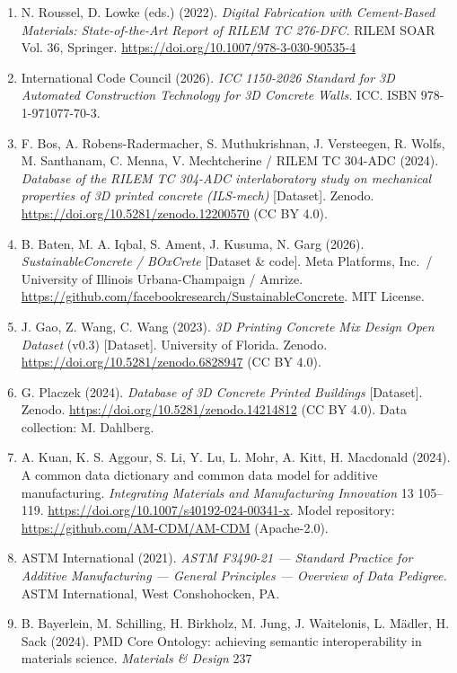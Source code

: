 \documentclass[
  11pt,
  letterpaper,
]{article}
\begin{document}
\begin{enumerate}
\item
  N. Roussel, D. Lowke (eds.) (2022). \emph{Digital Fabrication with
  Cement-Based Materials: State-of-the-Art Report of RILEM TC 276-DFC.}
  RILEM SOAR Vol. 36, Springer.
  \url{https://doi.org/10.1007/978-3-030-90535-4}
\item
  International Code Council (2026). \emph{ICC 1150-2026 Standard for 3D
  Automated Construction Technology for 3D Concrete Walls.} ICC. ISBN
  978-1-971077-70-3.
\item
  F. Bos, A. Robens-Radermacher, S. Muthukrishnan, J. Versteegen, R.
  Wolfs, M. Santhanam, C. Menna, V. Mechtcherine / RILEM TC 304-ADC
  (2024). \emph{Database of the RILEM TC 304-ADC interlaboratory study
  on mechanical properties of 3D printed concrete (ILS-mech)}
  {[}Dataset{]}. Zenodo. \url{https://doi.org/10.5281/zenodo.12200570}
  (CC BY 4.0).
\item
  B. Baten, M. A. Iqbal, S. Ament, J. Kusuma, N. Garg (2026).
  \emph{SustainableConcrete / BOxCrete} {[}Dataset \& code{]}. Meta
  Platforms, Inc.~/ University of Illinois Urbana-Champaign / Amrize.
  \url{https://github.com/facebookresearch/SustainableConcrete}. MIT
  License.
\item
  J. Gao, Z. Wang, C. Wang (2023). \emph{3D Printing Concrete Mix Design
  Open Dataset} (v0.3) {[}Dataset{]}. University of Florida. Zenodo.
  \url{https://doi.org/10.5281/zenodo.6828947} (CC BY 4.0).
\item
  G. Placzek (2024). \emph{Database of 3D Concrete Printed Buildings}
  {[}Dataset{]}. Zenodo. \url{https://doi.org/10.5281/zenodo.14214812}
  (CC BY 4.0). Data collection: M. Dahlberg.
\item
  A. Kuan, K. S. Aggour, S. Li, Y. Lu, L. Mohr, A. Kitt, H. Macdonald
  (2024). A common data dictionary and common data model for additive
  manufacturing. \emph{Integrating Materials and Manufacturing
  Innovation} 13 105--119.
  \url{https://doi.org/10.1007/s40192-024-00341-x}. Model repository:
  \url{https://github.com/AM-CDM/AM-CDM} (Apache-2.0).
\item
  ASTM International (2021). \emph{ASTM F3490-21 --- Standard Practice
  for Additive Manufacturing --- General Principles --- Overview of Data
  Pedigree.} ASTM International, West Conshohocken, PA.
\item
  B. Bayerlein, M. Schilling, H. Birkholz, M. Jung, J. Waitelonis, L.
  Mädler, H. Sack (2024). PMD Core Ontology: achieving semantic
  interoperability in materials science. \emph{Materials \& Design} 237


\end{enumerate}
\end{document}
